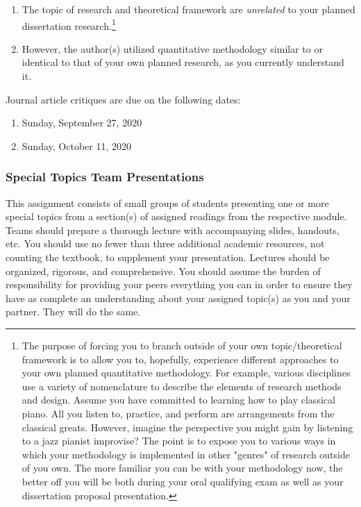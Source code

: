 \documentclass[
]{article}
\providecommand{\tightlist}{%
  \setlength{\itemsep}{0pt}\setlength{\parskip}{0pt}}
\begin{document}
\begin{enumerate}
\def\labelenumi{\arabic{enumi}.}
\tightlist
\item
  The topic of research and theoretical framework are \emph{unrelated}
  to your planned dissertation
  research.\footnote{The purpose of forcing you to branch outside of your own topic/theoretical framework is to allow you to, hopefully, experience different approaches to your own planned quantitative methodology. For example, various disciplines use a variety of nomenclature to describe the elements of research methods and design. Assume you have committed to learning how to play classical piano. All you listen to, practice, and perform are arrangements from the classical greats. However, imagine the perspective you might gain by listening to a jazz pianist improvise? The point is to expose you to various ways in which your methodology is implemented in other "genres" of research outside of you own. The more familiar you can be with your methodology now, the better off you will be both during your oral qualifying exam as well as your dissertation proposal presentation.}
\item
  However, the author(s) utilized quantitative methodology similar to or
  identical to that of your own planned research, as you currently
  understand it.
\end{enumerate}

Journal article critiques are due on the following dates:

\begin{enumerate}
\def\labelenumi{\arabic{enumi}.}
\tightlist
\item
  Sunday, September 27, 2020
\item
  Sunday, October 11, 2020
\end{enumerate}

\subsubsection{Special Topics Team Presentations}

This assignment consists of small groups of students presenting one or
more special topics from a section(s) of assigned readings from the
respective module. Teams should prepare a thorough lecture with
accompanying slides, handouts, etc. You should use no fewer than three
additional academic resources, not counting the textbook, to supplement
your presentation. Lectures should be organized, rigorous, and
comprehensive. You should assume the burden of responsibility for
providing your peers everything you can in order to ensure they have as
complete an understanding about your assigned topic(s) as you and your
partner. They will do the same.
\end{document}
